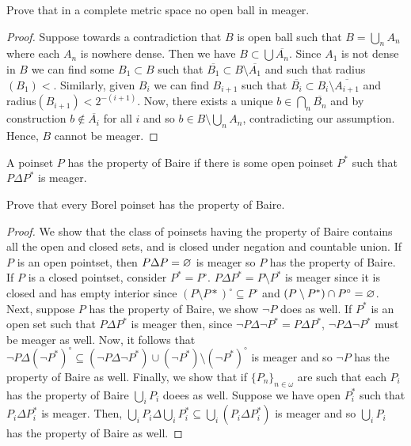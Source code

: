 
\begin{exercise}
    Prove that in a complete metric space no open ball in meager. 
\end{exercise}

\begin{proof}
    Suppose towards a contradiction that $B$ is open ball such that $B = \bigcup_n A_n$ where each $A_n$ is nowhere dense. Then we have $B \subset \bigcup \overline{A_n}$. Since $A_1$ is not dense in $B$ we can find some $B_1 \subset B$ such that $\overline{B_1} \subset B \setminus \overline{A_1}$ and such that radius$(B_1) < $. Similarly, given $B_i$ we can find $B_{i+1}$ such that $\overline{B_i} \subset B_i \setminus \overline{A_{i+1}}$ and radius$(B_{i+1})<2^{-(i+1)}$. Now, there exists a unique $b \in \bigcap_{n} \overline{B_n}$ and by construction $b \not\in \overline{A_i}$ for all $i$ and so $b \in B \setminus \bigcup_n A_n$, contradicting our assumption. Hence, $B$ cannot be meager.  
\end{proof}

\noindent
A poinset $P$ has the property of Baire if there is some open poinset $P^*$ such that $P \Delta P^*$ is meager.

\begin{exercise}
    Prove that every Borel poinset has the property of Baire. 
\end{exercise}

\begin{proof}
    We show that the class of poinsets having the property of Baire contains all the open and closed sets, and is closed under negation and countable union. If $P$ is an open pointset, then $P \Delta P = \varnothing$ is meager so $P$ has the property of Baire. If $P$ is a closed pointset, consider $P^* = P^{\circ}$. $P \Delta P^* = P \setminus P^*$ is meager since it is closed and has empty interior since $(P \setminus P*)^{\circ} \subseteq P^{\circ}$ and $(P \setminus P^*) \cap P^{\circ} = \varnothing$. Next, suppose $P$ has the property of Baire, we show $\neg P$ does as well. If $P^*$ is an open set such that $P \Delta P^*$ is meager then, since $\neg P \Delta \neg P^* = P \Delta P^*$, $\neg P \Delta \neg P^*$ must be meager as well. Now, it follows that $\neg P \Delta (\neg P^*)^{\circ} \subseteq (\neg P \Delta \neg P^*) \cup (\neg P^*)\setminus (\neg P^*)^{\circ}$ is meager and so $\neg P$ has the property of Baire as well. Finally, we show that if $\{P_n\}_{n \in \omega}$ are such that each $P_i$ has the property of Baire $\bigcup_i P_i$ doees as well. Suppose we have open $P_i^*$ such that $P_i \Delta P_i^*$ is meager. Then, $\bigcup_i P_i \Delta \bigcup_i P_i^* \subseteq \bigcup_i (P_i \Delta P_i^*)$ is meager and so $\bigcup_{i} P_i$ has the property of Baire as well.  
\end{proof}

